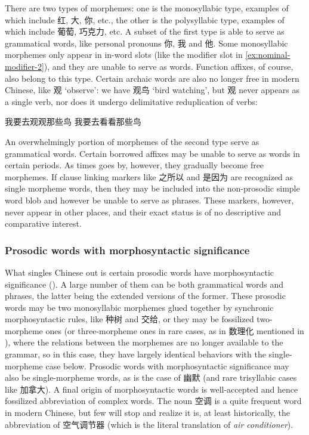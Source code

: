 \documentclass[UTF8, a4paper, oneside, scheme=plain]{ctexart}
\newcommand{\corpus}[1]{\emph{#1}}
\newcommand{\translate}[1]{`#1'}
\begin{document}
There are two types of morphemes:
one is the monosyllabic type, examples of which include 红, 大, 你, etc.,
the other is the polysyllabic type,
examples of which include 葡萄, 巧克力, etc.
A subset of the first type is able to serve as grammatical words,
like personal pronouns 你, 我 and 他.
Some monosyllabic morphemes only appear in in-word slots 
(like the modifier slot in \eqref{ex:nominal-modifier-2}),
and they are unable to serve as words.
Function affixes, of course, also belong to this type.
Certain archaic words are also no longer free in modern Chinese,
like 观 \translate{observe}:
we have 观鸟 \translate{bird watching},
but 观 never appears as a single verb, 
nor does it undergo delimitative reduplication of verbs:
\begin{exe}
    \ex \begin{xlist}
        \ex *我要去观观那些鸟
        \ex 我要去看看那些鸟
    \end{xlist}
\end{exe}
An overwhelmingly portion of morphemes of the second type serve as grammatical words.
Certain borrowed affixes may be unable to serve as words in certain periods.
As times goes by, however, they gradually become free morphemes.
If clause linking markers like 之所以 and 是因为 are recognized as single morpheme words,
then they may be included into the non-prosodic simple word blob 
and however be unable to serve as phrases.
These markers, however, never appear in other places,
and their exact status is of no descriptive and comparative interest. 

\subsubsection{Prosodic words with morphosyntactic significance}

What singles Chinese out is certain prosodic words have morphosyntactic significance 
().
A large number of them can be both grammatical words and phrases,
the latter being the extended versions of the former.
These prosodic words may be two monosyllabic morphemes glued together by synchronic morphosyntactic rules,
like 种树 and 交给,
or they may be fossilized two-morpheme ones
(or three-morpheme ones in rare cases,
as in 数理化 mentioned in ),
where the relations between the morphemes are no longer available to the grammar,
so in this case,
they have largely identical behaviors with the single-morpheme case below.
Prosodic words with morphosyntactic significance may also be single-morpheme words,
as is the case of 幽默 (and rare trisyllabic cases like 加拿大).
A final origin of morphosyntactic words 
is well-accepted and hence fossilized abbreviation of complex words.
The noun 空调 is a quite frequent word in modern Chinese,
but few will stop and realize it is, at least historically, 
the abbreviation of 空气调节器 (which is the literal translation of \corpus{air conditioner}).
\end{document}
